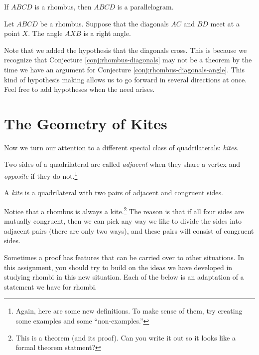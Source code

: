 \begin{conjecture}\label{conj:rhombus-is-parallelogram}
If $ABCD$ is a rhombus, then $ABCD$ is a parallelogram.
\end{conjecture}


\begin{conjecture}\label{conj:rhombus-diagonals-angle}
Let $ABCD$ be a rhombus. Suppose that the diagonals $AC$ and $BD$ meet at a point $X$.
The angle $AXB$ is a right angle.
\end{conjecture}

Note that we added the hypothesis that the diagonals cross.
This is because we recognize that Conjecture \ref{conj:rhombus-diagonals} may not be a theorem by the time we have an argument for Conjecture \ref{conj:rhombus-diagonals-angle}.
This kind of hypothesis making allows us to go forward in several directions at once.
Feel free to add hypotheses when the need arises.


\chapter{The Geometry of Kites}

Now we turn our attention to a different special class of quadrilaterals: \emph{kites}.

\begin{definition}\label{defn:quad-sides-type}
Two sides of a quadrilateral are called \emph{adjacent} when they share a vertex and \emph{opposite} if they do not.\footnote{Again, here are some new definitions. To make sense of them, try creating some examples and some ``non-examples.''}

\end{definition}


\begin{definition}\label{defn:kite}
A \emph{kite} is a quadrilateral with two pairs of adjacent and congruent sides.
\end{definition}

Notice that a rhombus is always a kite.\footnote{This is a theorem (and its proof). Can you write it out so it looks like a formal theorem statment?}
The reason is that if all four sides are mutually congruent, then we can pick any way we like to divide the sides into adjacent pairs (there are only two ways), and these pairs will consist of congruent sides.

Sometimes a proof has features that can be carried over to other situations.
In this assignment, you should try to build on the ideas we have developed in studying rhombi in this new situation.
Each of the below is an adaptation of a statement we have for rhombi.

